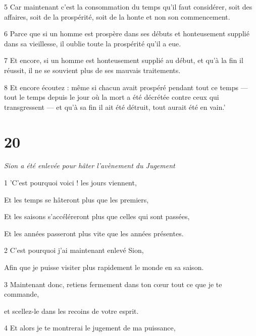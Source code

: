 \par 5 Car maintenant c'est la consommation du temps qu'il faut considérer, soit des affaires, soit de la prospérité, soit de la honte et non son commencement.

\par 6 Parce que si un homme est prospère dans ses débuts et honteusement supplié dans sa vieillesse, il oublie toute la prospérité qu'il a eue.

\par 7 Et encore, si un homme est honteusement supplié au début, et qu'à la fin il réussit, il ne se souvient plus de ses mauvais traitements.

\par 8 Et encore écoutez : même si chacun avait prospéré pendant tout ce temps — tout le temps depuis le jour où la mort a été décrétée contre ceux qui transgressent — et qu'à sa fin il ait été détruit, tout aurait été en vain.'

\chapter{20}

\par \textit{Sion a été enlevée pour hâter l'avènement du Jugement}

\par 1 'C'est pourquoi voici ! les jours viennent,

\par Et les temps se hâteront plus que les premiers,

\par Et les saisons s'accéléreront plus que celles qui sont passées,

\par Et les années passeront plus vite que les années présentes.

\par 2 C'est pourquoi j'ai maintenant enlevé Sion,

\par Afin que je puisse visiter plus rapidement le monde en sa saison.

\par 3 Maintenant donc, retiens fermement dans ton cœur tout ce que je te commande,

\par et scellez-le dans les recoins de votre esprit.

\par 4 Et alors je te montrerai le jugement de ma puissance,

